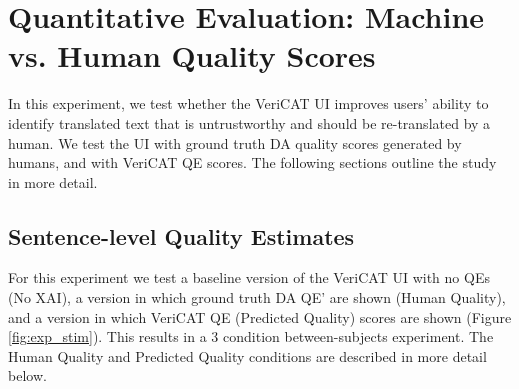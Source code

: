 \section{Quantitative Evaluation: Machine vs. Human Quality Scores} 

In this experiment, we test whether the VeriCAT UI improves users' ability to identify translated text that is untrustworthy and should be re-translated by a human. We test the UI with ground truth DA quality scores generated by humans, and with VeriCAT QE scores. The following sections outline the study in more detail. 

\subsection{Sentence-level Quality Estimates}

For this experiment we test a baseline version of the VeriCAT UI with no QEs (No XAI), a version in which ground truth DA QE' are shown (Human Quality), and a version in which VeriCAT QE (Predicted Quality) scores are shown (Figure \ref{fig:exp_stim}). This results in a 3 condition between-subjects experiment. 
The Human Quality and Predicted Quality conditions are described in more detail below.  

